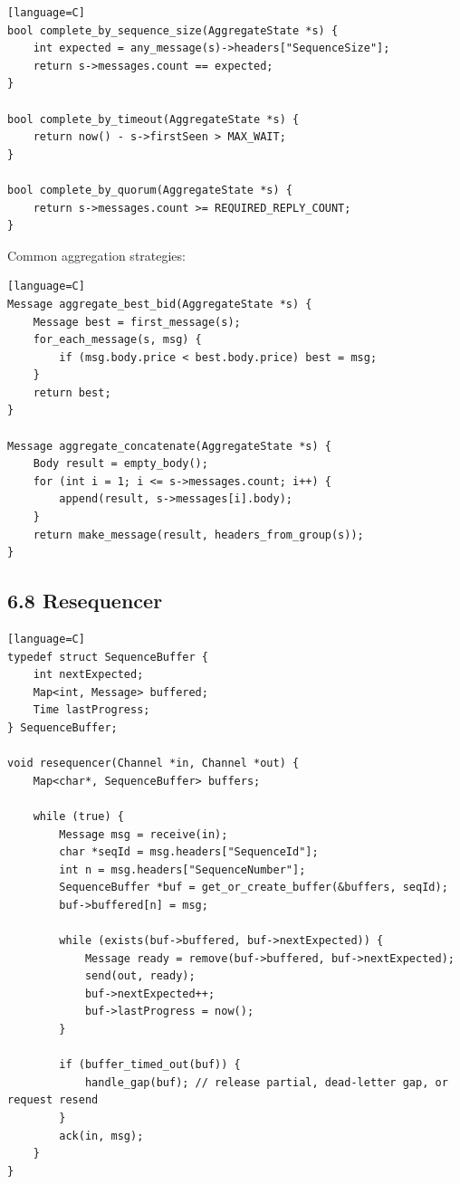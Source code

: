 \documentclass[11pt]{article}
\begin{document}
\begin{verbatim}[language=C]
bool complete_by_sequence_size(AggregateState *s) {
    int expected = any_message(s)->headers["SequenceSize"];
    return s->messages.count == expected;
}

bool complete_by_timeout(AggregateState *s) {
    return now() - s->firstSeen > MAX_WAIT;
}

bool complete_by_quorum(AggregateState *s) {
    return s->messages.count >= REQUIRED_REPLY_COUNT;
}
\end{verbatim}

Common aggregation strategies:

\begin{verbatim}[language=C]
Message aggregate_best_bid(AggregateState *s) {
    Message best = first_message(s);
    for_each_message(s, msg) {
        if (msg.body.price < best.body.price) best = msg;
    }
    return best;
}

Message aggregate_concatenate(AggregateState *s) {
    Body result = empty_body();
    for (int i = 1; i <= s->messages.count; i++) {
        append(result, s->messages[i].body);
    }
    return make_message(result, headers_from_group(s));
}
\end{verbatim}

\subsection{6.8 Resequencer}\label{resequencer}

\begin{verbatim}[language=C]
typedef struct SequenceBuffer {
    int nextExpected;
    Map<int, Message> buffered;
    Time lastProgress;
} SequenceBuffer;

void resequencer(Channel *in, Channel *out) {
    Map<char*, SequenceBuffer> buffers;

    while (true) {
        Message msg = receive(in);
        char *seqId = msg.headers["SequenceId"];
        int n = msg.headers["SequenceNumber"];
        SequenceBuffer *buf = get_or_create_buffer(&buffers, seqId);
        buf->buffered[n] = msg;

        while (exists(buf->buffered, buf->nextExpected)) {
            Message ready = remove(buf->buffered, buf->nextExpected);
            send(out, ready);
            buf->nextExpected++;
            buf->lastProgress = now();
        }

        if (buffer_timed_out(buf)) {
            handle_gap(buf); // release partial, dead-letter gap, or request resend
        }
        ack(in, msg);
    }
}
\end{verbatim}
\end{document}
